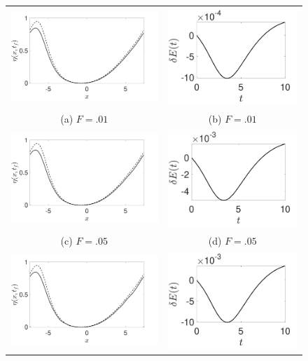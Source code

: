 \documentclass[a4paper,11pt]{article}
\begin{document}
\begin{figure}
\centering
\begin{tabular}{cc}
\includegraphics[width=.45\textwidth]{profiles_wm_1_modu_pt9} & \includegraphics[width=.4\textwidth]{energy_wm_1_modu_pt9}\\
(a)  $F=.01$ & (b)  $F=.01$\\
\includegraphics[width=.45\textwidth]{profiles_wm_5_modu_pt9} & \includegraphics[width=.4\textwidth]{energy_wm_5_modu_pt9}\\
(c)  $F=.05$ & (d)  $F=.05$\\
\includegraphics[width=.45\textwidth]{profiles_wm_10_modu_pt9} & \includegraphics[width=.4\textwidth]{energy_wm_10_modu_pt9}\\

\end{tabular}
\end{figure}
\end{document}
